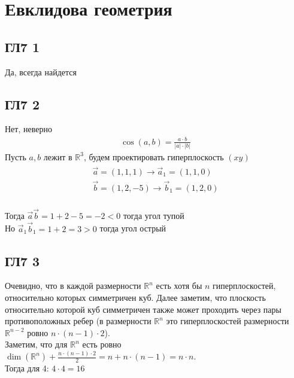 \newpage		
	\section{Евклидова геометрия}
		
		\subsection{ГЛ7 1}
		Да, всегда найдется
		
		\subsection{ГЛ7 2}
		Нет, неверно\\
		\begin{gather*}
			\cos(a,b) = \frac{a \cdot b}{|a| \cdot |b|}
		\end{gather*}
		Пусть $a, b$ лежит в $\mathbb{R}^3$, будем проектировать гиперплоскость $(xy)$\\
		\begin{gather*}
			\begin{matrix}
				\vec{a} = (1,1,1) \to \vec{a}_1 = (1,1,0)\\
				\vec{b} = (1,2,-5) \to \vec{b}_1 = (1,2,0)
			\end{matrix}
		\end{gather*}\\
		Тогда $\vec{a} \vec{b} = 1 + 2 - 5 = -2 < 0$ тогда угол тупой\\
		Но $\vec{a}_1 \vec{b}_1 = 1 + 2 = 3 > 0$ тогда угол острый\\

		\subsection{ГЛ7 3}
		Очевидно, что в каждой размерности $\mathbb{R}^{n}$ есть хотя бы $n$ гиперплоскостей, относительно которых симметричен куб. Далее заметим, что плоскость относительно которой куб симметричен также может проходить через пары противоположных ребер (в размерности $\mathbb{R}^{n}$ это гиперплоскостей размерности $\mathbb{R}^{n-2}$ ровно $n \cdot (n-1) \cdot 2$).\\
		Заметим, что для $\mathbb{R}^n$ есть ровно $\dim(\mathbb{R}^n) + \frac{n \cdot (n-1) \cdot 2}{2} = n + n \cdot (n-1) = n \cdot n$.\\
		Тогда для 4: $4 \cdot 4 = 16$ 
		
		\begin{comment}
			Решим задачу для $n$: Заметим, что если рассмотреть полный граф, состоящий из вершин, являющихся серединами граней размерности $n-1$ ($K_{2^{n}}$), то любая плоскость симметрии будет пересекать часть ребер в середине, с частью не будет пересекаться, а оставшиеся будут лежать в ней. 
		\end{comment}
		
